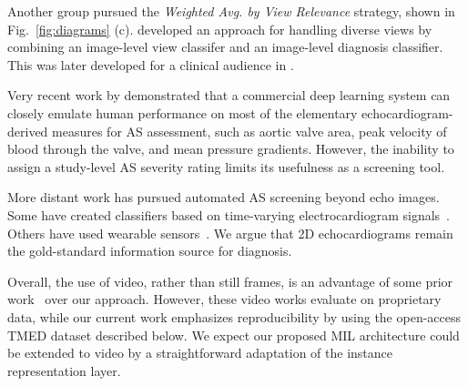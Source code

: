 Another group pursued the \emph{Weighted Avg. by View Relevance} strategy, shown in Fig.~\ref{fig:diagrams} (c).
\citet{huang2021new} developed an approach for handling diverse views by combining an image-level view classifer and an image-level diagnosis classifier. This was later developed for a clinical audience in \citet{wessler2023automated}.

Very recent work by \citet{krishna2023fully} demonstrated that a commercial deep learning system can closely emulate human performance on most of the elementary echocardiogram-derived measures for AS assessment, such as aortic valve area, peak velocity of blood through the valve, and mean pressure gradients. However, the inability to assign a study-level AS severity rating limits its usefulness as a screening tool.

More distant work has pursued automated AS screening beyond echo images.
Some have created classifiers based on time-varying electrocardiogram signals~\citep{cohen2021electrocardiogram, elias2022deep}. Others have used wearable sensors~\citep{yangClassificationAorticStenosis2020}.
We argue that 2D echocardiograms remain the gold-standard information source for diagnosis.

Overall, the use of video, rather than still frames, is an advantage of some prior work~\citep{dai2023identifying,holste2022automated} over our approach.
However, these video works evaluate on proprietary data, while our current work emphasizes reproducibility by using the open-access TMED dataset described below.
We expect our proposed MIL architecture could be extended to video by a straightforward adaptation of the instance representation layer.